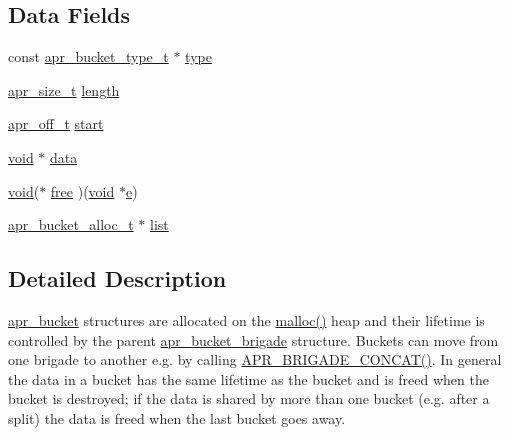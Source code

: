 \subsection*{Data Fields}
\begin{DoxyCompactItemize}
\item 
const \hyperlink{structapr__bucket__type__t}{apr\+\_\+bucket\+\_\+type\+\_\+t} $\ast$ \hyperlink{structapr__bucket_ac27fa5ce798e688ad243ebe1615937fc}{type}
\item 
\hyperlink{group__apr__platform_gaaa72b2253f6f3032cefea5712a27540e}{apr\+\_\+size\+\_\+t} \hyperlink{structapr__bucket_a0898dfc78d9275187189b9a745e619bf}{length}
\item 
\hyperlink{group__apr__platform_ga6938af9075cec15c88299109381aa984}{apr\+\_\+off\+\_\+t} \hyperlink{structapr__bucket_a4a8791b606b3ad613b8672ec94145628}{start}
\item 
\hyperlink{group__MOD__ISAPI_gacd6cdbf73df3d9eed42fa493d9b621a6}{void} $\ast$ \hyperlink{structapr__bucket_a7fc4604750889b3f762bda1a786d276a}{data}
\item 
\hyperlink{group__MOD__ISAPI_gacd6cdbf73df3d9eed42fa493d9b621a6}{void}($\ast$ \hyperlink{structapr__bucket_a0949c5d398756496e69449c2633975f1}{free} )(\hyperlink{group__MOD__ISAPI_gacd6cdbf73df3d9eed42fa493d9b621a6}{void} $\ast$\hyperlink{pcregrep_8txt_acd90314acb2c2e5cd19681136c08efac}{e})
\item 
\hyperlink{structapr__bucket__alloc__t}{apr\+\_\+bucket\+\_\+alloc\+\_\+t} $\ast$ \hyperlink{structapr__bucket_a5a500b80105834621514d6c0814d0966}{list}
\end{DoxyCompactItemize}


\subsection{Detailed Description}
\hyperlink{structapr__bucket}{apr\+\_\+bucket} structures are allocated on the \hyperlink{util__expr__parse_8c_a5faf6a2d99f50a4655dd390199a8db7b}{malloc()} heap and their lifetime is controlled by the parent \hyperlink{structapr__bucket__brigade}{apr\+\_\+bucket\+\_\+brigade} structure. Buckets can move from one brigade to another e.\+g. by calling \hyperlink{group__APR__Util__Bucket__Brigades_ga7cecbc89be912ce9ab24c889eb8f955b}{A\+P\+R\+\_\+\+B\+R\+I\+G\+A\+D\+E\+\_\+\+C\+O\+N\+C\+A\+T()}. In general the data in a bucket has the same lifetime as the bucket and is freed when the bucket is destroyed; if the data is shared by more than one bucket (e.\+g. after a split) the data is freed when the last bucket goes away. 

